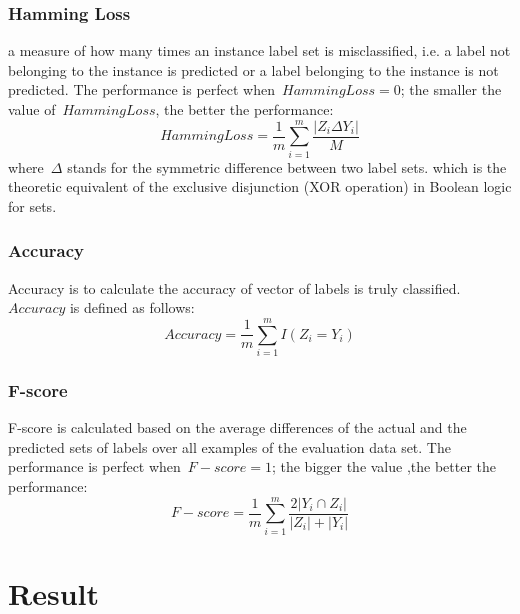 \documentclass[12pt]{article}
\begin{document}

\subsubsection{Hamming Loss} a measure of how many times an instance label set is misclassified, i.e. a label not belonging to the instance is predicted or a label belonging to the instance is not predicted. The performance is perfect when~$Hamming Loss=0$; the smaller the value of~$Hamming Loss$, the better the performance:
\begin{equation} 
 Hamming Loss= \frac{1}{m}\sum_{i=1}^{m}  \frac{|Z_i\Delta Y_i|}{M}
\end{equation}
where~$\Delta$ stands for the symmetric difference between two label sets. which is the theoretic equivalent of the exclusive disjunction (XOR operation) in Boolean logic for sets.
\subsubsection{Accuracy}
 Accuracy is to calculate the accuracy of vector of labels is truly classified. $ Accuracy$ is defined as follows:
\begin{equation} 
 Accuracy= \frac{1}{m}\sum_{i=1}^{m}  I(Z_i = Y_i)
\end{equation}
\subsubsection{F-score} F-score is calculated based on the average differences of the actual and the predicted sets of labels over all examples of the evaluation data set. The performance is perfect when~$F-score = 1$; the bigger the value ,the better the performance:
\begin{equation} 
 F-score= \frac{1}{m}\sum_{i=1}^{m} \frac{2|Y_i \cap Z_i|}{|Z_i|+|Y_i|}
\end{equation}
\section{Result}
\end{document}

